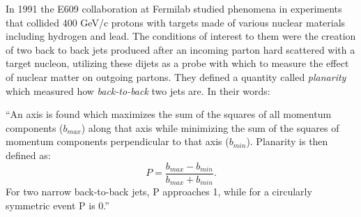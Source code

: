 In 1991 the E609 collaboration at Fermilab studied phenomena in experiments that collided 400 GeV/c protons with targets made of various nuclear materials including hydrogen and lead\citep{Corcoran:1990vq}. The conditions of interest to them were the creation of two back to back jets produced after an incoming parton hard scattered with a target nucleon, utilizing these dijets as a probe with which to measure the effect of nuclear matter on outgoing partons. They defined a quantity called \textit{planarity} which measured how \textit{back-to-back} two jets are. In their words:
\begin{addmargin}[1.5em]{2em}
``An axis is found which maximizes the sum of the squares of all momentum components ($b_{max}$) along that axis while minimizing the sum of the squares of momentum components perpendicular to that axis ($b_{min}$). Planarity is then defined as: 
\begin{equation}
P = \frac{b_{max}-b_{min}}{b_{max}+b_{min}}.
\end{equation}
For two narrow back-to-back jets, P approaches 1, while for a circularly symmetric event P is 0.''
\end{addmargin}

